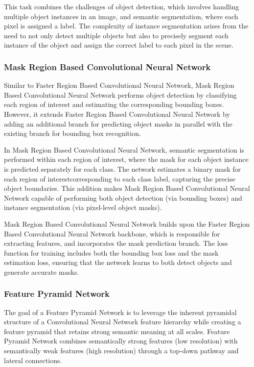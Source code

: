 This task combines the challenges of object detection, which involves handling multiple object instances in an image, and semantic segmentation, where each pixel is assigned a label. 
The complexity of instance segmentation arises from the need to not only detect multiple objects but also to precisely segment each instance of the object and assign the correct label to each pixel in the scene.

\subsubsection{Mask Region Based Convolutional Neural Network} 
Similar to Faster Region Based Convolutional Neural Network, Mask Region Based Convolutional Neural Network performs object detection by classifying each region of interest and estimating the corresponding bounding boxes. 
However, it extends Faster Region Based Convolutional Neural Network by adding an additional branch for predicting object masks in parallel with the existing branch for bounding box recognition. 

In Mask Region Based Convolutional Neural Network, semantic segmentation is performed within each region of interest, where the mask for each object instance is predicted separately for each class. 
The network estimates a binary mask for each region of interestcorresponding to each class label, capturing the precise object boundaries. 
This addition makes Mask Region Based Convolutional Neural Network capable of performing both object detection (via bounding boxes) and instance segmentation (via pixel-level object masks).

Mask Region Based Convolutional Neural Network builds upon the Faster Region Based Convolutional Neural Network backbone, which is responsible for extracting features, and incorporates the mask prediction branch. 
The loss function for training includes both the bounding box loss and the mask estimation loss, ensuring that the network learns to both detect objects and generate accurate masks.

\subsubsection{Feature Pyramid Network}
The goal of a Feature Pyramid Network is to leverage the inherent pyramidal structure of a Convolutional Neural Network feature hierarchy while creating a feature pyramid that retains strong semantic meaning at all scales. 
Feature Pyramid Network combines semantically strong features (low resolution) with semantically weak features (high resolution) through a top-down pathway and lateral connections.

